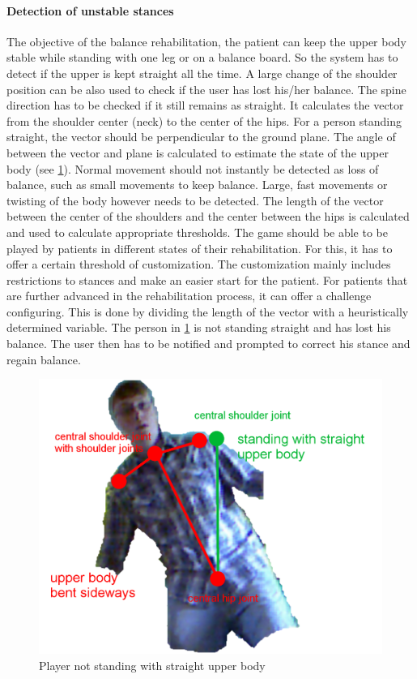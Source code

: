 \paragraph{Detection of unstable stances}
The objective of the balance rehabilitation, the patient can keep the upper body stable while standing with one leg or on a balance board. So the system has to detect if the upper is kept straight all the time.  A large change of the shoulder position can be also used to check if the user has lost his/her balance. The spine direction has to be checked if it still remains as straight.
It calculates the vector from the shoulder center (neck) to the center of the hips. For a person standing straight, the vector should be perpendicular to the ground plane. The angle of between the vector and plane is calculated to estimate the state of the upper body (see \figurename{\ref{fig:3-IMR:rehabilitationSraight}}). 
Normal movement should not instantly be detected as loss of balance, such as small movements to keep balance. Large, fast movements or twisting of the body however needs to be detected. The length of the vector between the center of the shoulders and the center between the hips is calculated and used to calculate appropriate thresholds. The game should be able to be played by patients in different states of their rehabilitation. For this, it has to offer a certain threshold of customization. The customization mainly includes restrictions to stances and make an easier start for the patient. For patients that are further advanced in the rehabilitation process, it can offer a challenge configuring.
This is done by dividing the length of the vector with a heuristically determined variable. The person in \figurename{\ref{fig:3-IMR:rehabilitationSraight}} is not standing straight and has lost his balance. The user then has to be notified and prompted to correct his stance and regain balance.
\begin{figure}
	\centering
	\includegraphics[width=0.7\linewidth]{figures/3-IMR/rehabilitationSraight}
	\caption{Player not standing with straight upper body}
	\label{fig:3-IMR:rehabilitationSraight}
\end{figure}

